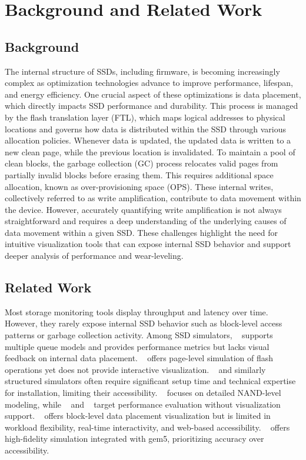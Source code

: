 \documentclass{ieeeaccess}
\begin{document}
\section{Background and Related Work}
\label{subsec:related_work}

\subsection{Background}
The internal structure of SSDs, including firmware, is becoming increasingly complex as optimization technologies advance to improve performance, lifespan, and energy efficiency. One crucial aspect of these optimizations is data placement, which directly impacts SSD performance and durability. This process is managed by the flash translation layer (FTL), which maps logical addresses to physical locations and governs how data is distributed within the SSD through various allocation policies. Whenever data is updated, the updated data is written to a new clean page, while the previous location is invalidated. To maintain a pool of clean blocks, the garbage collection (GC) process relocates valid pages from partially invalid blocks before erasing them. This requires additional space allocation, known as over-provisioning space (OPS). These internal writes, collectively referred to as write amplification, contribute to data movement within the device. However, accurately quantifying write amplification is not always straightforward and requires a deep understanding of the underlying causes of data movement within a given SSD. These challenges highlight the need for intuitive visualization tools that can expose internal SSD behavior and support deeper analysis of performance and wear-leveling.

\subsection{Related Work}
Most storage monitoring tools display throughput and latency over time. However, they rarely expose internal SSD behavior such as block-level access patterns or garbage collection activity. Among SSD simulators, \mqsim~\cite{MQSim-USENIX18} supports multiple queue models and provides performance metrics but lacks visual feedback on internal data placement.
\flashsim~\cite{FlashSim-FICASS-09} offers page-level simulation of flash operations yet does not provide interactive visualization. \ssdmodel~\cite{SSDModel-USENIX-TC-08} and similarly structured simulators often require significant setup time and technical expertise for installation, limiting their accessibility. \nandflashsim~\cite{NANDFlashSim-TOS-16} focuses on detailed NAND-level modeling, while \vssim~\cite{VSSIM-MSST-13} and \wiscsim~\cite{WiscSim-EuroSys-17} target performance evaluation without visualization support. \ssdplayer~\cite{visualizationSSDPlayer} offers block-level data placement visualization but is limited in workload flexibility, real-time interactivity, and web-based accessibility. \simplessd~\cite{SimpleSSD-IEEE18} offers high-fidelity simulation integrated with gem5, prioritizing accuracy over accessibility.
\end{document}
